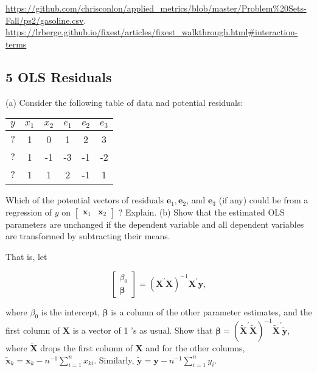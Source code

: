 \documentclass[11pt]{article}
\begin{document}
\url{https://github.com/chrisconlon/applied_metrics/blob/master/Problem%20Sets-Fall/ps2/gasoline.csv}.\\

\url{https://lrberge.github.io/fixest/articles/fixest_walkthrough.html#interaction-terms}
\subsection*{5 OLS Residuals} 

(a) Consider the following table of data nad potential residuals:\\
\begin{tabular}{cccccc}
$y$ & $x_1$ & $x_2$ & $e_1$ & $e_2$ & $e_3$ \\
\hline$?$ & 1 & 0 & 1 & 2 & 3 \\
$?$ & 1 & -1 & -3 & -1 & -2 \\
$?$ & 1 & 1 & 2 & -1 & 1
\end{tabular}

Which of the potential vectors of residuals $\boldsymbol{e}_1, \boldsymbol{e}_2$, and $\boldsymbol{e}_3$ (if any) could be from a regression of $y$ on $\left[\begin{array}{ll}\boldsymbol{x}_1 & \boldsymbol{x}_2\end{array}\right]$ ? Explain.
(b) Show that the estimated OLS parameters are unchanged if the dependent variable and all dependent variables are transformed by subtracting their means.

That is, let

$$
\left[\begin{array}{c}
\beta_0 \\
\boldsymbol{\beta}
\end{array}\right]=\left(\boldsymbol{X}^{\prime} \boldsymbol{X}\right)^{-1} \boldsymbol{X}^{\prime} \boldsymbol{y},
$$

where $\beta_0$ is the intercept, $\boldsymbol{\beta}$ is a column of the other parameter estimates, and the first column of $\boldsymbol{X}$ is a vector of 1 's as usual. Show that $\boldsymbol{\beta}=\left(\widetilde{\boldsymbol{X}}^{\prime} \widetilde{\boldsymbol{X}}\right)^{-1} \widetilde{\boldsymbol{X}}^{\prime} \widetilde{\boldsymbol{y}}$, where $\widetilde{\boldsymbol{X}}$ drops the first column of $\boldsymbol{X}$ and for the other columns, $\widetilde{\boldsymbol{x}}_k=\boldsymbol{x}_k-n^{-1} \sum_{i=1}^n x_{k i}$. Similarly, $\widetilde{\boldsymbol{y}}=\boldsymbol{y}-n^{-1} \sum_{i=1}^n y_i$.
\end{document}

